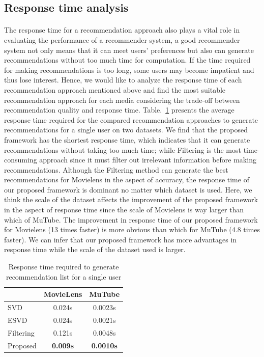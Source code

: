 \documentclass[a4paper,12pt]{report}
\begin{document}
\newpage
\clearpage
\subsection{Response time analysis}
\paragraph{}
The response time for a recommendation approach also plays a vital role in evaluating the performance of a recommender system, a good recommender system not only means that it can meet users' preferences but also can generate recommendations without too much time for computation. If the time required for making recommendations is too long, some users may become impatient and thus lose interest. Hence, we would like to analyze the response time of each recommendation approach mentioned above and find the most suitable recommendation approach for each media considering the trade-off between recommendation quality and response time. Table.~\ref{tab:response_time} presents the average response time required for the compared recommendation approaches to generate recommendations for a single user on two datasets. We find that the proposed framework has the shortest response time, which indicates that it can generate recommendations without taking too much time; while Filtering is the most time-consuming approach since it must filter out irrelevant information before making recommendations. Although the Filtering method can generate the best recommendations for Movielens in the aspect of accuracy, the response time of our proposed framework is dominant no matter which dataset is used. Here, we think the scale of the dataset affects the improvement of the proposed framework in the aspect of response time since the scale of Movielens is way larger than which of MuTube. The improvement in response time of our proposed framework for Movielens (13 times faster) is more obvious than which for MuTube (4.8 times faster). We can infer that our proposed framework has more advantages in response time while the scale of the dataset used is larger.

\begin{table}[!htb]
    \centering
    \caption{Response time required to generate recommendation list for a single user}
    \begin{tabular}{|l||c c|}
    \hline
         & MovieLens & MuTube \\
    \hline
    SVD  &  0.024s     & 0.0023s\\
    ESVD &  0.024s     & 0.0021s\\ 
    Filtering & 0.121s & 0.0048s\\ 
    Proposed & \textbf{0.009s}  & \textbf{0.0010s}\\ 
    \hline
    \end{tabular}
    \label{tab:response_time}
\end{table}
\end{document}
